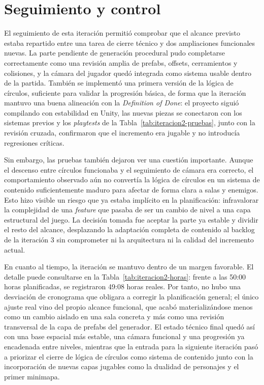 \section{Seguimiento y control}
El seguimiento de esta iteración permitió comprobar que el alcance previsto estaba repartido
entre una tarea de cierre técnico y dos ampliaciones funcionales nuevas. La parte pendiente de
generación procedural pudo completarse correctamente como una revisión amplia de prefabs,
offsets, cerramientos y colisiones, y la cámara del jugador quedó integrada como sistema
usable dentro de la partida. También se implementó una primera versión de la lógica de
círculos, suficiente para validar la progresión básica, de forma que la iteración mantuvo
una buena alineación con la \textit{Definition of Done}: el proyecto siguió compilando con
estabilidad en Unity, las nuevas piezas se conectaron con los sistemas previos y los
\textit{playtests} de la Tabla~\ref{tab:iteracion2-pruebas}, junto con la revisión cruzada,
confirmaron que el incremento era jugable y no introducía regresiones críticas.

Sin embargo, las pruebas también dejaron ver una cuestión importante. Aunque el descenso entre
círculos funcionaba y el seguimiento de cámara era correcto, el comportamiento observado aún
no convertía la lógica de círculos en un sistema de contenido suficientemente maduro para
afectar de forma clara a salas y enemigos. Esto hizo visible un riesgo que ya estaba implícito
en la planificación: infravalorar la complejidad de una \textit{feature} que pasaba de ser un
cambio de nivel a una capa estructural del juego. La decisión tomada fue aceptar la parte ya
estable y dividir el resto del alcance, desplazando la adaptación completa de contenido al
backlog de la iteración 3 sin comprometer ni la arquitectura ni la calidad del incremento
actual.

En cuanto al tiempo, la iteración se mantuvo dentro de un margen favorable. El detalle puede
consultarse en la Tabla~\ref{tab:iteracion2-horas}: frente a las 50:00 horas planificadas, se
registraron 49:08 horas reales. Por tanto, no hubo una desviación de cronograma que obligara
a corregir la planificación general; el único ajuste real vino del propio alcance funcional,
que acabó materializándose menos como un cambio aislado en una sala concreta y más como una
revisión transversal de la capa de prefabs del generador. El estado técnico final quedó así
con una base espacial más estable, una cámara funcional y una progresión ya encadenada entre
niveles, mientras que la entrada para la siguiente iteración pasó a priorizar el cierre de
lógica de círculos como sistema de contenido junto con la incorporación de nuevas capas
jugables como la dualidad de personajes y el primer minimapa.

